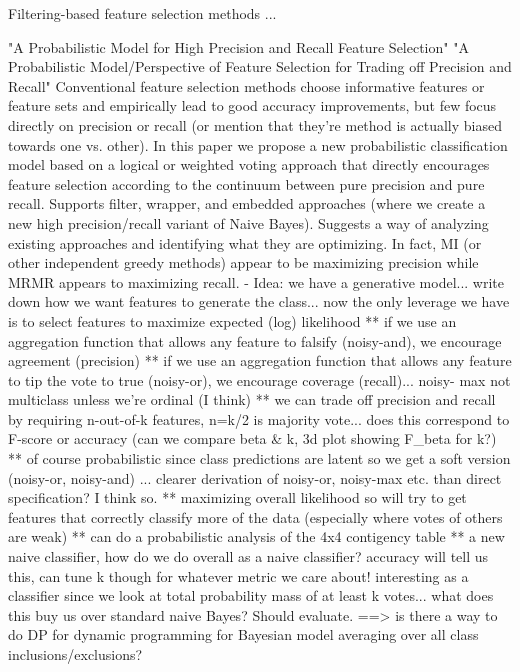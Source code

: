 Filtering-based feature selection methods ...


"A Probabilistic Model for High Precision and Recall Feature Selection"
"A Probabilistic Model/Perspective of Feature Selection for Trading off Precision and Recall"
Conventional feature selection methods choose informative features or feature sets and empirically lead to good accuracy improvements, but 
few focus directly on precision or recall (or mention that they're method is actually biased towards one vs. other).  In this paper we 
propose a new probabilistic classification model based on a logical or weighted voting approach that directly encourages feature selection 
according to the continuum between pure precision and pure recall.  Supports filter, wrapper, and embedded approaches (where we create a 
new high precision/recall variant of Naive Bayes).  Suggests a way of analyzing existing approaches and identifying what they are 
optimizing.  In fact, MI (or other independent greedy methods) appear to be maximizing precision while MRMR appears to maximizing recall.
- Idea: we have a generative model... write down how we want features to generate the class... now the only leverage we have is to select 
features to maximize expected (log) likelihood
** if we use an aggregation function that allows any feature to falsify (noisy-and), we encourage agreement (precision)
** if we use an aggregation function that allows any feature to tip the vote to true (noisy-or), we encourage coverage (recall)... noisy-
max not multiclass unless we're ordinal (I think)
** we can trade off precision and recall by requiring n-out-of-k features, n=k/2 is majority vote... does this correspond to F-score or 
accuracy (can we compare beta & k, 3d plot showing F_beta for k?)
** of course probabilistic since class predictions are latent so we get a soft version (noisy-or, noisy-and) ... clearer derivation of 
noisy-or, noisy-max etc. than direct specification?  I think so.
** maximizing overall likelihood so will try to get features that correctly classify more of the data (especially where votes of others are 
weak)
** can do a probabilistic analysis of the 4x4 contigency table
** a new naive classifier, how do we do overall as a naive classifier?  accuracy will tell us this, can tune k though for whatever metric 
we care about!  interesting as a classifier since we look at total probability mass of at least k votes... what does this buy us over 
standard naive Bayes?  Should evaluate.
==> is there a way to do DP for dynamic programming for Bayesian model averaging over all class inclusions/exclusions?
